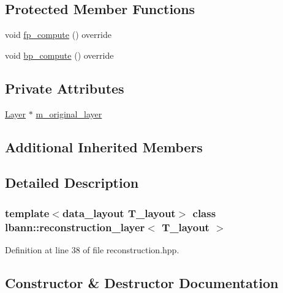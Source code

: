 \subsection*{Protected Member Functions}
\begin{DoxyCompactItemize}
\item 
void \hyperlink{classlbann_1_1reconstruction__layer_ad33ec2cccf89b317e22ec73b1761e427}{fp\+\_\+compute} () override
\item 
void \hyperlink{classlbann_1_1reconstruction__layer_a58408a14bfe5212b12243640ed284744}{bp\+\_\+compute} () override
\end{DoxyCompactItemize}
\subsection*{Private Attributes}
\begin{DoxyCompactItemize}
\item 
\hyperlink{classlbann_1_1Layer}{Layer} $\ast$ \hyperlink{classlbann_1_1reconstruction__layer_a077a29792de2a39015da8b18120a00e3}{m\+\_\+original\+\_\+layer}
\end{DoxyCompactItemize}
\subsection*{Additional Inherited Members}


\subsection{Detailed Description}
\subsubsection*{template$<$data\+\_\+layout T\+\_\+layout$>$\newline
class lbann\+::reconstruction\+\_\+layer$<$ T\+\_\+layout $>$}



Definition at line 38 of file reconstruction.\+hpp.



\subsection{Constructor \& Destructor Documentation}
\mbox{\label{classlbann_1_1reconstruction__layer_a8850ac54a21d11de778ad6a442f80ae1}} 

